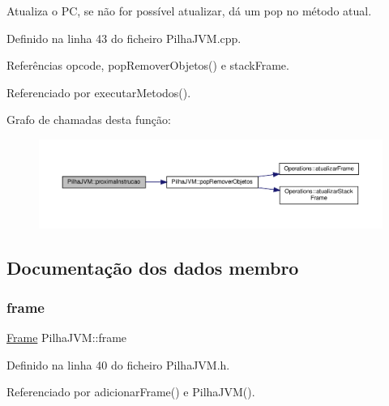 Atualiza o PC, se não for possível atualizar, dá um pop no método atual. 



Definido na linha 43 do ficheiro Pilha\+J\+V\+M.\+cpp.



Referências opcode, pop\+Remover\+Objetos() e stack\+Frame.



Referenciado por executar\+Metodos().

Grafo de chamadas desta função\+:\nopagebreak
\begin{figure}[H]
\begin{center}
\leavevmode
\includegraphics[width=350pt]{classPilhaJVM_a914a4707e58e23e8913fcdc0c53f8c5c_cgraph}
\end{center}
\end{figure}


\subsection{Documentação dos dados membro}
\mbox{\label{classPilhaJVM_adebac9c22fbb328afca1d2a98e6d486c}} 
\subsubsection{\texorpdfstring{frame}{frame}}
{\footnotesize\ttfamily \hyperlink{PilhaJVM_8h_acc380914b41a084dcc8e4b38fb200145}{Frame} Pilha\+J\+V\+M\+::frame\hspace{0.3cm}{\ttfamily [private]}}



Definido na linha 40 do ficheiro Pilha\+J\+V\+M.\+h.



Referenciado por adicionar\+Frame() e Pilha\+J\+V\+M().

\mbox{\label{classPilhaJVM_a90e6f9da43b72798ea0331c57b72af09}} 
